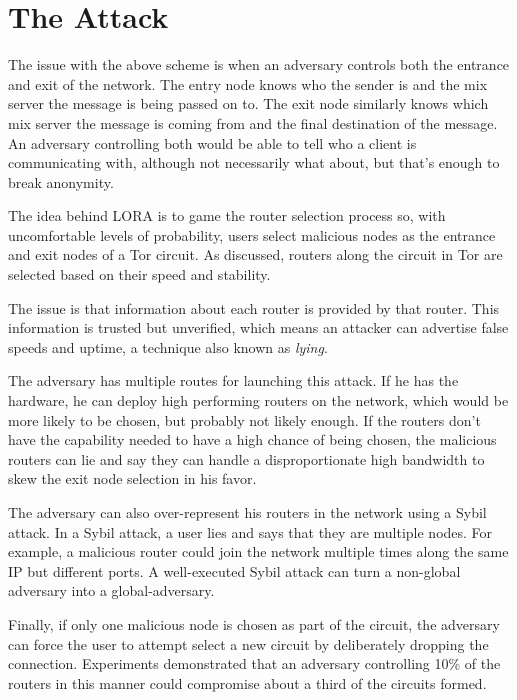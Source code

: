 \documentclass[10pt,a4paper]{article}
\begin{document}
\section{The Attack}
The issue with the above scheme is when an adversary controls both the entrance and exit of the network.
The entry node knows who the sender is and the mix server the message is being passed on to.
The exit node similarly knows which mix server the message is coming from and the final destination of the message.
An adversary controlling both would be able to tell who a client is communicating with, although not necessarily what about, but that's enough to break anonymity. 

The idea behind LORA is to game the router selection process so, with uncomfortable levels of probability, users select malicious nodes as the entrance and exit nodes of a Tor circuit.
As discussed, routers along the circuit in Tor are selected based on their speed and stability.


The issue is that information about each router is provided by that router.
This information is trusted but unverified, which means an attacker can advertise false speeds and uptime, a technique also known as \textit{lying}.

The adversary has multiple routes for launching this attack.
If he has the hardware, he can deploy high performing routers on the network, which would be more likely to be chosen, but probably not likely enough.
If the routers don't have the capability needed to have a high chance of being chosen, the malicious routers can lie and say they can handle a disproportionate high bandwidth to skew the exit node selection in his favor.

The adversary can also over-represent his routers in the network using a Sybil \cite{dhtsec} attack.
In a Sybil attack, a user lies and says that they are multiple nodes.
For example, a malicious router could join the network multiple times along the same IP but different ports.
A well-executed Sybil attack can turn a non-global adversary into a global-adversary.

Finally, if only one malicious node is chosen as part of the circuit, the adversary can force the user to attempt select a new circuit by deliberately dropping the connection.
Experiments demonstrated that an adversary controlling 10\% of the routers in this manner could compromise about a third of the circuits formed.
\end{document}
